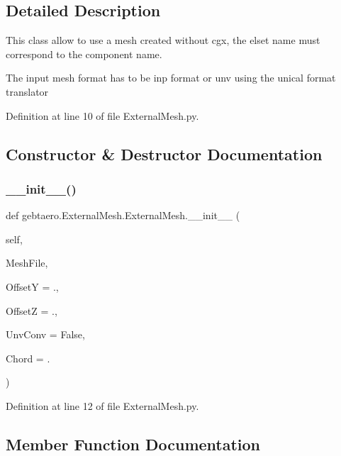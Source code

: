 \subsection{Detailed Description}
This class allow to use a mesh created without cgx, the elset name must correspond to the component name. 

The input mesh format has to be inp format or unv using the unical format translator 

Definition at line 10 of file External\+Mesh.\+py.



\subsection{Constructor \& Destructor Documentation}
\mbox{\label{classgebtaero_1_1_external_mesh_1_1_external_mesh_ad1301073ba0c00d8ad8fe3dc4baa6068}} 
\subsubsection{\texorpdfstring{\+\_\+\+\_\+init\+\_\+\+\_\+()}{\_\_init\_\_()}}
{\footnotesize\ttfamily def gebtaero.\+External\+Mesh.\+External\+Mesh.\+\_\+\+\_\+init\+\_\+\+\_\+ (\begin{DoxyParamCaption}\item[{}]{self,  }\item[{}]{Mesh\+File,  }\item[{}]{OffsetY = {.},  }\item[{}]{OffsetZ = {.},  }\item[{}]{Unv\+Conv = {\ttfamily False},  }\item[{}]{Chord = {.} }\end{DoxyParamCaption})}



Definition at line 12 of file External\+Mesh.\+py.



\subsection{Member Function Documentation}
\mbox{\label{classgebtaero_1_1_external_mesh_1_1_external_mesh_ad1c3ba8013a6829353d55d9513d49359}} 
